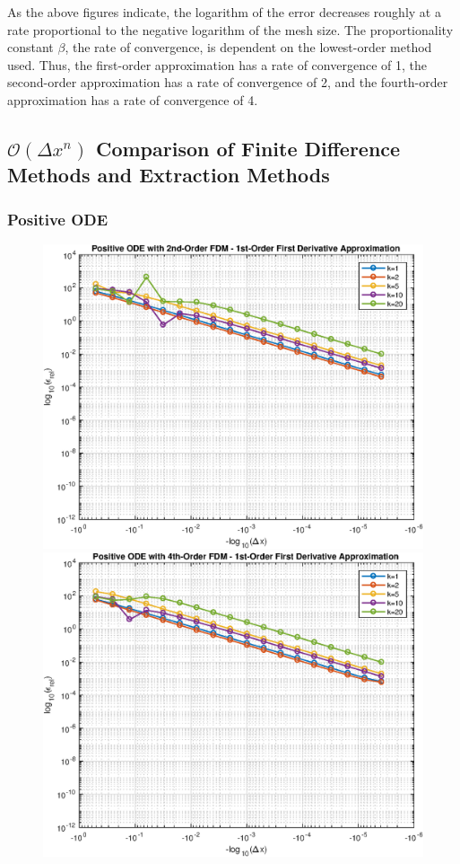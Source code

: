 \documentclass[10pt, reqno]{article}		%
\numberwithin{equation}{section}
\begin{document}
As the above figures indicate, the logarithm of the error decreases roughly at a rate proportional to the negative logarithm of the mesh size. The proportionality constant $\beta$, the rate of convergence, is dependent on the lowest-order method used. Thus, the first-order approximation has a rate of convergence of 1, the second-order approximation has a rate of convergence of 2, and the fourth-order approximation has a rate of convergence of 4.

\newpage

\subsection{$\mathcal{O}(\Delta x^n)$ Comparison of Finite Difference Methods and Extraction Methods}

\subsubsection{Positive ODE}

\begin{figure}[H]
	\begin{center}
		\includegraphics[width=0.46\linewidth]{positive_ode_order_2_fd_order_1}
		\includegraphics[width=0.46\linewidth]{positive_ode_order_4_fd_order_1}
	\end{center}
\end{figure}
\end{document}
